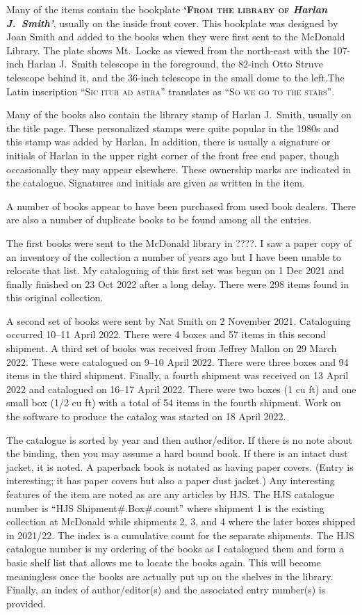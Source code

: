 Many of the items contain the bookplate {\bfseries\textsc{`From the
    library of} \textit{Harlan J.~Smith'}}, usually on the inside front
cover. This bookplate was designed by Joan Smith and added to the
books when they were first sent to the McDonald Library. The plate
shows Mt.~Locke as viewed from the north-east with the 107-inch Harlan
J.~Smith telescope in the foreground, the 82-inch Otto Struve
telescope behind it, and the 36-inch telescope in the small dome to
the left.The Latin inscription \textsc{``Sic itur ad astra''}
translates as \textsc{``So we go to the stars''}.

Many of the books also contain the library stamp of Harlan J.~Smith,
usually on the title page. These personalized stamps were quite
popular in the 1980s and this stamp was added by Harlan. In addition,
there is usually a signature or initials of Harlan in the upper right
corner of the front free end paper, though occasionally they may appear
elsewhere.  These ownership marks are indicated in the catalogue.
Signatures and initials are given as written in the item.

A number of books appear to have been purchased from used book dealers.
There are also a number of duplicate books to be found among all the
entries. 

The first books were sent to the McDonald library in ????.  I saw a
paper copy of an inventory of the collection a number of years ago but
I have been unable to relocate that list. My cataloguing of this first
set was begun on 1 Dec 2021 and finally finished on 23 Oct 2022 after
a long delay. There were 298 items found in this original collection.

A second set of books were sent by Nat Smith on 2 November 2021.
Cataloguing occurred 10--11 April 2022. There were 4 boxes and 57 items
in this second shipment. A third set of books was received from
Jeffrey Mallon on 29 March 2022. These were catalogued on 9--10 April
2022. There were three boxes and 94 items in the third
shipment. Finally, a fourth shipment was received on 13 April 2022 and
catalogued on 16--17 April 2022. There were two boxes (1 cu ft) and
one small box (1/2 cu ft) with a total of 54 items in the fourth
shipment.  Work on the software to produce the catalog was started on
18 April 2022.

The catalogue is sorted by year and then author/editor. If there is no
note about the binding, then you may assume a hard bound book. If
there is an intact dust jacket, it is noted. A paperback book is
notated as having paper covers. (Entry  is interesting; it
has paper covers but also a paper dust jacket.) Any interesting
features of the item are noted as are any articles by HJS.  The HJS
catalogue number is ``HJS Shipment\#.Box\#.count'' where shipment 1 is
the existing collection at McDonald while shipments 2, 3, and 4 where
the later boxes shipped in 2021/22. The index is a cumulative count
for the separate shipments. The HJS catalogue number is my ordering of
the books as I catalogued them and form a basic shelf list that allows
me to locate the books again.  This will become meaningless once the
books are actually put up on the shelves in the library. Finally, an
index of author/editor(s) and the associated entry number(s) is
provided.

